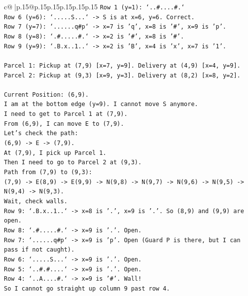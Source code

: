 \documentclass{article}
\begin{document}
{\begin{supertabular}{c@{$\;$}|p{.15\linewidth}@{}p{.15\linewidth}p{.15\linewidth}p{.15\linewidth}p{.15\linewidth}p{.15\linewidth}}
{{{\texttt{Row 1 (y=1): `..\#....\#.`} \\
\texttt{Row 6 (y=6): `.....S...` {-}> S is at x=6, y=6. Correct.} \\
\texttt{Row 7 (y=7): `......q\#p` {-}> x=7 is 'q', x=8 is '\#', x=9 is 'p'.} \\
\texttt{Row 8 (y=8): `.\#.....\#.` {-}> x=2 is '\#', x=8 is '\#'.} \\
\texttt{Row 9 (y=9): `.B.x..1..` {-}> x=2 is 'B', x=4 is 'x', x=7 is '1'.} \\
\\ 
\texttt{Parcel 1: Pickup at (7,9) {[}x=7, y=9{]}. Delivery at (4,9) {[}x=4, y=9{]}.} \\
\texttt{Parcel 2: Pickup at (9,3) {[}x=9, y=3{]}. Delivery at (8,2) {[}x=8, y=2{]}.} \\
\\ 
\texttt{Current Position: (6,9).} \\
\texttt{I am at the bottom edge (y=9). I cannot move S anymore.} \\
\texttt{I need to get to Parcel 1 at (7,9).} \\
\texttt{From (6,9), I can move E to (7,9).} \\
\texttt{Let's check the path:} \\
\texttt{(6,9) {-}> E {-}> (7,9).} \\
\texttt{At (7,9), I pick up Parcel 1.} \\
\texttt{Then I need to go to Parcel 2 at (9,3).} \\
\texttt{Path from (7,9) to (9,3):} \\
\texttt{(7,9) {-}> E(8,9) {-}> E(9,9) {-}> N(9,8) {-}> N(9,7) {-}> N(9,6) {-}> N(9,5) {-}> N(9,4) {-}> N(9,3).} \\
\texttt{Wait, check walls.} \\
\texttt{Row 9: `.B.x..1..` {-}> x=8 is '.', x=9 is '.'. So (8,9) and (9,9) are open.} \\
\texttt{Row 8: `.\#.....\#.` {-}> x=9 is '.'. Open.} \\
\texttt{Row 7: `......q\#p` {-}> x=9 is 'p'. Open (Guard P is there, but I can pass if not caught).} \\
\texttt{Row 6: `.....S...` {-}> x=9 is '.'. Open.} \\
\texttt{Row 5: `..\#.\#....` {-}> x=9 is '.'. Open.} \\
\texttt{Row 4: `..A....\#.` {-}> x=9 is '\#'. Wall!} \\
\texttt{So I cannot go straight up column 9 past row 4.} \\
}}}
\end{supertabular}}
\end{document}
